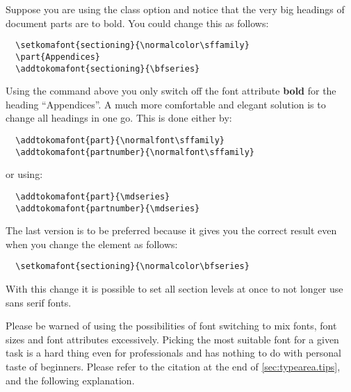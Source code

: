 \begin{Example}
  Suppose you are using the class option  and notice
  that the very big headings of document parts are to bold. You could change
  this as follows:
\begin{lstlisting}
  \setkomafont{sectioning}{\normalcolor\sffamily}
  \part{Appendices}
  \addtokomafont{sectioning}{\bfseries}
\end{lstlisting}
  Using the command above you only switch off the font attribute
  \textbf{bold} for the heading ``Appendices''. A much more comfortable
  and elegant solution is to change all  headings in one go.
  This is done either by:
\begin{lstlisting}
  \addtokomafont{part}{\normalfont\sffamily}
  \addtokomafont{partnumber}{\normalfont\sffamily}
\end{lstlisting}
  or using:
\begin{lstlisting}
  \addtokomafont{part}{\mdseries}
  \addtokomafont{partnumber}{\mdseries}
\end{lstlisting}
  The last version is to be preferred because it gives you the correct
  result even when you change the 
  element as follows:
\begin{lstlisting}
  \setkomafont{sectioning}{\normalcolor\bfseries}
\end{lstlisting}
  With this change it is possible to set all section levels at once to not
  longer use sans serif fonts.
\end{Example}

Please be warned of using the possibilities of font switching to mix fonts,
font sizes and font attributes excessively. Picking the most suitable font for
a given task is a hard thing even for professionals and has nothing to do with
personal taste of beginners. Please refer to the citation at the end of
\autoref{sec:typearea.tips},  and the
following explanation.

